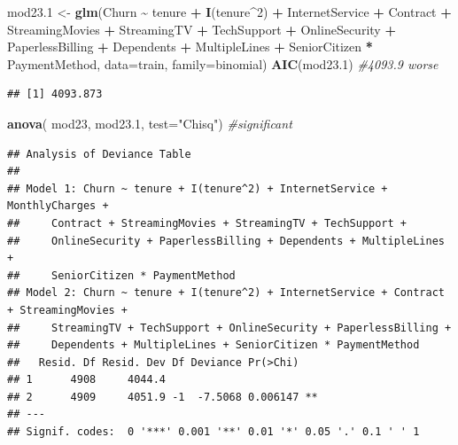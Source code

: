 \documentclass[
  twoside]{article}
\newenvironment{Shaded}{\begin{snugshade}}{\end{snugshade}}
\newcommand{\AttributeTok}[1]{\textcolor[rgb]{0.13,0.29,0.53}{#1}}
\newcommand{\CommentTok}[1]{\textcolor[rgb]{0.56,0.35,0.01}{\textit{#1}}}
\newcommand{\DecValTok}[1]{\textcolor[rgb]{0.00,0.00,0.81}{#1}}
\newcommand{\FloatTok}[1]{\textcolor[rgb]{0.00,0.00,0.81}{#1}}
\newcommand{\FunctionTok}[1]{\textcolor[rgb]{0.13,0.29,0.53}{\textbf{#1}}}
\newcommand{\NormalTok}[1]{#1}
\newcommand{\OtherTok}[1]{\textcolor[rgb]{0.56,0.35,0.01}{#1}}
\newcommand{\SpecialCharTok}[1]{\textcolor[rgb]{0.81,0.36,0.00}{\textbf{#1}}}
\newcommand{\StringTok}[1]{\textcolor[rgb]{0.31,0.60,0.02}{#1}}
\begin{document}
\begin{Shaded}
\begin{Highlighting}[]
\NormalTok{mod23}\FloatTok{.1} \OtherTok{\textless{}{-}} \FunctionTok{glm}\NormalTok{(Churn }\SpecialCharTok{\textasciitilde{}}\NormalTok{ tenure }\SpecialCharTok{+} \FunctionTok{I}\NormalTok{(tenure}\SpecialCharTok{\^{}}\DecValTok{2}\NormalTok{) }\SpecialCharTok{+}\NormalTok{ InternetService }\SpecialCharTok{+}\NormalTok{ Contract }\SpecialCharTok{+} 
\NormalTok{                 StreamingMovies }\SpecialCharTok{+}\NormalTok{ StreamingTV }\SpecialCharTok{+}\NormalTok{ TechSupport }\SpecialCharTok{+}\NormalTok{ OnlineSecurity }\SpecialCharTok{+} 
\NormalTok{                 PaperlessBilling }\SpecialCharTok{+}\NormalTok{ Dependents }\SpecialCharTok{+}\NormalTok{ MultipleLines }\SpecialCharTok{+} 
\NormalTok{                 SeniorCitizen }\SpecialCharTok{*}\NormalTok{ PaymentMethod, }\AttributeTok{data=}\NormalTok{train, }\AttributeTok{family=}\NormalTok{binomial)}
\FunctionTok{AIC}\NormalTok{(mod23}\FloatTok{.1}\NormalTok{) }\CommentTok{\#4093.9 worse}
\end{Highlighting}
\end{Shaded}

\begin{verbatim}
## [1] 4093.873
\end{verbatim}

\begin{Shaded}
\begin{Highlighting}[]
\FunctionTok{anova}\NormalTok{( mod23, mod23}\FloatTok{.1}\NormalTok{,  }\AttributeTok{test=}\StringTok{"Chisq"}\NormalTok{) }\CommentTok{\#significant}
\end{Highlighting}
\end{Shaded}

\begin{verbatim}
## Analysis of Deviance Table
## 
## Model 1: Churn ~ tenure + I(tenure^2) + InternetService + MonthlyCharges + 
##     Contract + StreamingMovies + StreamingTV + TechSupport + 
##     OnlineSecurity + PaperlessBilling + Dependents + MultipleLines + 
##     SeniorCitizen * PaymentMethod
## Model 2: Churn ~ tenure + I(tenure^2) + InternetService + Contract + StreamingMovies + 
##     StreamingTV + TechSupport + OnlineSecurity + PaperlessBilling + 
##     Dependents + MultipleLines + SeniorCitizen * PaymentMethod
##   Resid. Df Resid. Dev Df Deviance Pr(>Chi)   
## 1      4908     4044.4                        
## 2      4909     4051.9 -1  -7.5068 0.006147 **
## ---
## Signif. codes:  0 '***' 0.001 '**' 0.01 '*' 0.05 '.' 0.1 ' ' 1
\end{verbatim}
\end{document}
